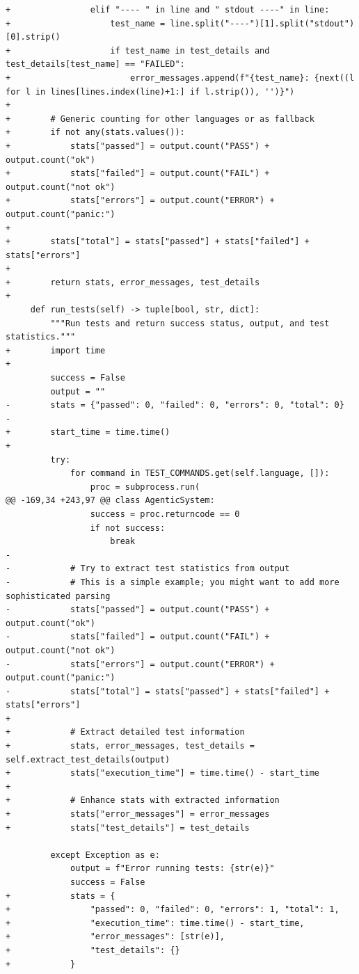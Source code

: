 \documentclass{article}
\begin{document}
\begin{lstlisting}[style=diffstyle]
+                elif "---- " in line and " stdout ----" in line:
+                    test_name = line.split("----")[1].split("stdout")[0].strip()
+                    if test_name in test_details and test_details[test_name] == "FAILED":
+                        error_messages.append(f"{test_name}: {next((l for l in lines[lines.index(line)+1:] if l.strip()), '')}")
+
+        # Generic counting for other languages or as fallback
+        if not any(stats.values()):
+            stats["passed"] = output.count("PASS") + output.count("ok")
+            stats["failed"] = output.count("FAIL") + output.count("not ok")
+            stats["errors"] = output.count("ERROR") + output.count("panic:")
+            
+        stats["total"] = stats["passed"] + stats["failed"] + stats["errors"]
+        
+        return stats, error_messages, test_details
+
     def run_tests(self) -> tuple[bool, str, dict]:
         """Run tests and return success status, output, and test statistics."""
+        import time
+        
         success = False
         output = ""
-        stats = {"passed": 0, "failed": 0, "errors": 0, "total": 0}
-
+        start_time = time.time()
+        
         try:
             for command in TEST_COMMANDS.get(self.language, []):
                 proc = subprocess.run(
@@ -169,34 +243,97 @@ class AgenticSystem:
                 success = proc.returncode == 0
                 if not success:
                     break
-
-            # Try to extract test statistics from output
-            # This is a simple example; you might want to add more sophisticated parsing
-            stats["passed"] = output.count("PASS") + output.count("ok")
-            stats["failed"] = output.count("FAIL") + output.count("not ok")
-            stats["errors"] = output.count("ERROR") + output.count("panic:")
-            stats["total"] = stats["passed"] + stats["failed"] + stats["errors"]
+            
+            # Extract detailed test information
+            stats, error_messages, test_details = self.extract_test_details(output)
+            stats["execution_time"] = time.time() - start_time
+            
+            # Enhance stats with extracted information
+            stats["error_messages"] = error_messages
+            stats["test_details"] = test_details
             
         except Exception as e:
             output = f"Error running tests: {str(e)}"
             success = False
+            stats = {
+                "passed": 0, "failed": 0, "errors": 1, "total": 1,
+                "execution_time": time.time() - start_time,
+                "error_messages": [str(e)],
+                "test_details": {}
+            }
 

\end{lstlisting}
\end{document}

